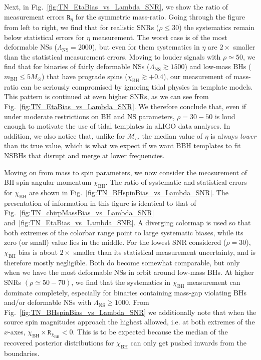 \documentclass[aps,prd,amsmath,floats,floatfix, twocolumn,
superscriptaddress,nofootinbib,showpacs]{revtex4-1}
\newcommand{\lambdans}{\Lambda_\mathrm{NS}}
\newcommand{\chibh}{\chi_\mathrm{BH}}
\newcommand{\mbh}{m_\mathrm{BH}}
\newcommand{\mchirp}{\mathcal{M}_c}
\newcommand{\arr}{\mathtt{R}}
\begin{document}
Next, in Fig.~\ref{fig:TN_EtaBias_vs_Lambda_SNR}, we show the ratio of
measurement errors $\arr_\eta$ for the symmetric mass-ratio.
% 
Going through the figure from left to right, we find that for realistic
SNRs ($\rho\leq 30$) the systematics remain below statistical errors for
$\eta$ measurement. The worst case is of the most deformable NSs
($\lambdans = 2000$), but even for them systematics in $\eta$ are $2\times$
smaller than the statistical measurement errors.
% 
Moving to louder signals with $\rho\simeq 50$, we find that for binaries of
fairly deformable NSs ($\lambdans\gtrsim 1500$) and low-mass BHs
($\mbh\leq 5M_\odot$) that have prograde spins ($\chibh\gtrsim +0.4$), our
measurement of mass-ratio can be seriously compromised by ignoring tidal
physics in template models. 
% 
This pattern is continued at even higher SNRs, as we can see from
Fig.~\ref{fig:TN_EtaBias_vs_Lambda_SNR}. We therefore conclude that, even if
under moderate restrictions on BH and NS parameters, $\rho=30-50$ is loud enough
to motivate the use of tidal templates in aLIGO data analyses.
% 
In addition, we also notice that, unlike for $\mchirp$, the median value of
$\eta$ is always {\it lower} than its true value, which is what we expect if we
want BBH templates to fit NSBHs that disrupt and merge at lower frequencies.



Moving on from mass to spin parameters, we now consider the measurement of BH
spin angular momentum $\chibh$. The ratio of systematic and statistical errors
for $\chibh$ are shown in
Fig.~\ref{fig:TN_BHspinBias_vs_Lambda_SNR}. The presentation of information in this 
figure is identical to that of Fig.~\ref{fig:TN_chirpMassBias_vs_Lambda_SNR}
and~\ref{fig:TN_EtaBias_vs_Lambda_SNR}. A diverging colormap is used so that both 
extremes of the colorbar range point to large systematic biases, while its zero (or
small) value lies in the middle.
% 
For the lowest SNR considered ($\rho=30$), $\chibh$ bias is about $2\times$
smaller than its statistical measurement uncertainty, and is therefore mostly
negligible. Both do become somewhat comparable, but only when we have the most
deformable NSs in orbit around low-mass BHs. 
% 
At higher SNRs $(\rho\simeq50-70)$, we find that the systematics in $\chibh$
measurement can dominate completely, especially for binaries containing
mass-gap violating BHs and/or deformable NSs with $\lambdans\geq1000$.
% 
From Fig.~\ref{fig:TN_BHspinBias_vs_Lambda_SNR} we additionally note that when
the source spin magnitudes approach the highest allowed, i.e. at both extremes
of the $x$-axes, $\chibh\times\arr_{\chibh}<0$. This is to be expected because
the median of the recovered posterior distributions for $\chibh$ can only get
pushed inwards from the boundaries.
\end{document}

